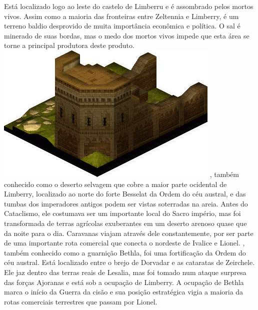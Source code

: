 Está localizado logo ao leste do castelo de Limberru e é assombrado pelos mortos vivos.
Assim como a maioria das fronteiras entre Zeltennia e Limberry, é um terreno baldio desprovido de muita importância econômica e política.
O sal é minerado de suas bordas, mas o medo dos mortos vivos impede que esta área se torne a principal produtora deste produto.
%
\vfill
\includegraphics[width=\columnwidth]{./art/worldbook/bethla.jpg}
\vfill
%
, também conhecido como o deserto selvagem que cobre a maior parte ocidental de Limberry, localizado ao norte do forte Besselat da Ordem do céu austral, e das tumbas dos imperadores antigos podem ser vistas soterradas na areia.
Antes do Cataclismo, ele costumava ser um importante local do Sacro império, mas foi transformada de terras agrícolas exuberantes em um deserto arenoso quase que da noite para o dia.
Caravanas viajam através dele constantemente, por ser parte de uma importante rota comercial que conecta o nordeste de Ivalice e Lionel.
, também conhecido como a guarnição Bethla, foi uma fortificação da Ordem do céu austral.
Está localizado entre o brejo de Dorvadar e as cataratas de Zeirchele.
Ele jaz dentro das terras reais de Lesalia, mas foi tomado num ataque surpresa das forças Ajoranas e está sob a ocupação de Limberry.
A ocupação de Bethla marca o início da Guerra da cisão e sua posição estratégica vigia a maioria da rotas comerciais terrestres que passam por Lionel.
%
\vfill
